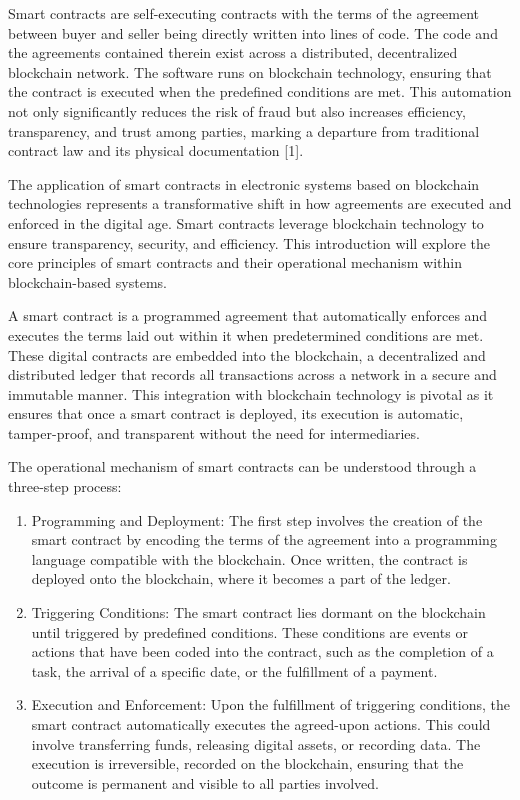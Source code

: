 Smart contracts are self-executing contracts with the terms of the
agreement between buyer and seller being directly written into lines of
code. The code and the agreements contained therein exist across a
distributed, decentralized blockchain network. The software runs on
blockchain technology, ensuring that the contract is executed when the
predefined conditions are met. This automation not only significantly
reduces the risk of fraud but also increases efficiency, transparency,
and trust among parties, marking a departure from traditional contract
law and its physical documentation {[}1{]}.

The application of smart contracts in electronic systems based on
blockchain technologies represents a transformative shift in how
agreements are executed and enforced in the digital age. Smart contracts
leverage blockchain technology to ensure transparency, security, and
efficiency. This introduction will explore the core principles of smart
contracts and their operational mechanism within blockchain-based
systems.

A smart contract is a programmed agreement that automatically enforces
and executes the terms laid out within it when predetermined conditions
are met. These digital contracts are embedded into the blockchain, a
decentralized and distributed ledger that records all transactions
across a network in a secure and immutable manner. This integration with
blockchain technology is pivotal as it ensures that once a smart
contract is deployed, its execution is automatic, tamper-proof, and
transparent without the need for intermediaries.

The operational mechanism of smart contracts can be understood through a
three-step process:

\begin{enumerate}
\def\labelenumi{\arabic{enumi}.}
\item
  Programming and Deployment: The first step involves the creation of
  the smart contract by encoding the terms of the agreement into a
  programming language compatible with the blockchain. Once written, the
  contract is deployed onto the blockchain, where it becomes a part of
  the ledger.
\item
  Triggering Conditions: The smart contract lies dormant on the
  blockchain until triggered by predefined conditions. These conditions
  are events or actions that have been coded into the contract, such as
  the completion of a task, the arrival of a specific date, or the
  fulfillment of a payment.
\item
  Execution and Enforcement: Upon the fulfillment of triggering
  conditions, the smart contract automatically executes the agreed-upon
  actions. This could involve transferring funds, releasing digital
  assets, or recording data. The execution is irreversible, recorded on
  the blockchain, ensuring that the outcome is permanent and visible to
  all parties involved.
\end{enumerate}

